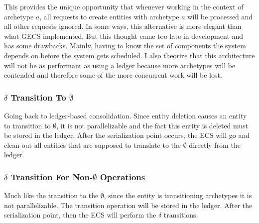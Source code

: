 This provides the unique opportunity that whenever working in the context of archetype $a$, all requests to create entities with archetype $a$ will be processed and all other requests ignored. In some ways, this alternative is more elegant than what GECS implemented. But this thought came too late in development and has some drawbacks. Mainly, having to know the set of components the system depends on before the system gets scheduled. I also theorize that this architecture will not be as performant as using a ledger because more archetypes will be contended and therefore some of the more concurrent work will be lost.

\subsubsection{$\delta$ Transition To $\emptyset$}
Going back to ledger-based consolidation. Since entity deletion causes an entity to transition to $\emptyset$, it is not parallelizable and the fact this entity is deleted must be stored in the ledger. After the serialization point occurs, the ECS will go and clean out all entities that are supposed to translate to the $\emptyset$ directly from the ledger. 

\subsubsection{$\delta$ Transition For Non-$\emptyset$ Operations}
Much like the transition to the $\emptyset$, since the entity is transitioning archetypes it is not parallelizable. The transition operation will be stored in the ledger. After the serialization point, then the ECS will perform the $\delta$ transitions. 
